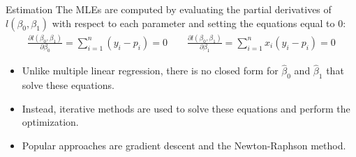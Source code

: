 \documentclass[10pt]{beamer}\usepackage[]{graphicx}\usepackage[]{color}
\begin{document}
\begin{frame}{Estimation}
The MLEs are computed by evaluating the partial derivatives of $l(\beta_0, \beta_1)$ with respect to each parameter and setting the equations equal to 0: 
\begin{align*}
\frac{\partial l(\beta_0, \beta_1)}{\partial \beta_0} = \sum_{i=1}^n (y_i - p_i) = 0 \qquad
\frac{\partial l(\beta_0, \beta_1)}{\partial \beta_1} = \sum_{i=1}^n x_i (y_i - p_i) = 0
\end{align*}
\begin{itemize}
\item Unlike multiple linear regression, there is no closed form for $\hat{\beta}_0$ and $\hat{\beta}_1$ that solve these equations.
\vspace{5pt}
\item Instead, iterative methods are used to solve these equations and perform the optimization. 
\vspace{5pt}
\item Popular approaches are gradient descent and the Newton-Raphson method.
\end{itemize}
\end{frame}
\end{document}
